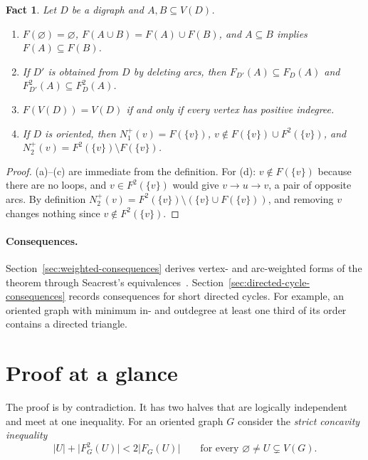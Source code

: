 \documentclass[11pt]{article}
\newtheorem{fact}[theorem]{Fact}
\theoremstyle{remark}
\newcommand{\abs}[1]{\lvert #1\rvert}
\begin{document}
\begin{fact}\label{fact:image}
Let $D$ be a digraph and $A,B\subseteq V(D)$.
\begin{enumerate}[label=\textup{(\alph*)}]
\item $F(\varnothing)=\varnothing$, $F(A\cup B)=F(A)\cup F(B)$, and
$A\subseteq B$ implies $F(A)\subseteq F(B)$.
\item If $D'$ is obtained from $D$ by deleting arcs, then
$F_{D'}(A)\subseteq F_D(A)$ and $F_{D'}^2(A)\subseteq F_D^2(A)$.
\item $F(V(D))=V(D)$ if and only if every vertex has positive indegree.
\item If $D$ is oriented, then $N_1^+(v)=F(\{v\})$,
$v\notin F(\{v\})\cup F^2(\{v\})$, and
$N_2^+(v)=F^2(\{v\})\setminus F(\{v\})$.
\end{enumerate}
\end{fact}

\begin{proof}
(a)--(c) are immediate from the definition. For (d): $v\notin F(\{v\})$
because there are no loops, and $v\in F^2(\{v\})$ would give $v\to u\to v$,
a pair of opposite arcs. By definition
$N_2^+(v)=F^2(\{v\})\setminus(\{v\}\cup F(\{v\}))$, and removing $v$ changes
nothing since $v\notin F^2(\{v\})$.
\end{proof}

\paragraph{Consequences.}
Section~\ref{sec:weighted-consequences} derives vertex- and arc-weighted
forms of the theorem through Seacrest's equivalences~\cite{Seacrest2015}.
Section~\ref{sec:directed-cycle-consequences} records consequences for short
directed cycles. For example, an oriented graph with minimum in- and
outdegree at least one third of its order contains a directed triangle.

\section{Proof at a glance}\label{sec:glance}

The proof is by contradiction. It has two halves that are logically
independent and meet at one inequality. For an oriented graph $G$ consider
the \emph{strict concavity inequality}
\begin{equation}\label{eq:overview-concavity}
 \abs{U}+\abs{F_G^2(U)}<2\abs{F_G(U)}
 \qquad\text{for every }\varnothing\ne U\subsetneq V(G).
\end{equation}
\end{document}

